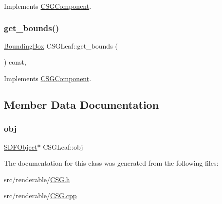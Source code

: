 Implements \mbox{\hyperlink{classCSGComponent_a41ca7aff9b7c481ea076f81eeb826779}{C\+S\+G\+Component}}.

\mbox{\label{classCSGLeaf_aba3f65b725aa0a697664b9dda80b4df3}} 
\subsubsection{\texorpdfstring{get\_bounds()}{get\_bounds()}}
{\footnotesize\ttfamily \mbox{\hyperlink{classBoundingBox}{Bounding\+Box}} C\+S\+G\+Leaf\+::get\+\_\+bounds (\begin{DoxyParamCaption}{ }\end{DoxyParamCaption}) const\hspace{0.3cm}{\ttfamily [override]}, {\ttfamily [virtual]}}



Implements \mbox{\hyperlink{classCSGComponent_a4299365f2bab69272af9de4f2bee7cdb}{C\+S\+G\+Component}}.



\subsection{Member Data Documentation}
\mbox{\label{classCSGLeaf_a6bb40cb3c028d643273d5da84f01e4b0}} 
\subsubsection{\texorpdfstring{obj}{obj}}
{\footnotesize\ttfamily \mbox{\hyperlink{classSDFObject}{S\+D\+F\+Object}}$\ast$ C\+S\+G\+Leaf\+::obj\hspace{0.3cm}{\ttfamily [private]}}



The documentation for this class was generated from the following files\+:\begin{DoxyCompactItemize}
\item 
src/renderable/\mbox{\hyperlink{CSG_8h}{C\+S\+G.\+h}}\item 
src/renderable/\mbox{\hyperlink{CSG_8cpp}{C\+S\+G.\+cpp}}\end{DoxyCompactItemize}
